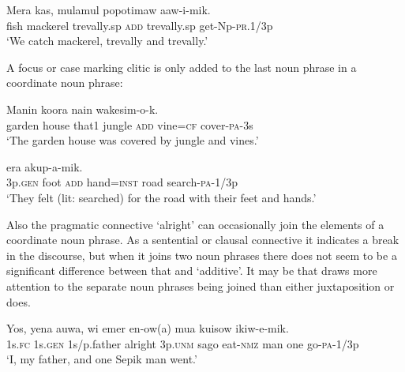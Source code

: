 \ea%
\label{ex:4:x814}
\gll Mera  kas,  mulamul    popotimaw  aaw-i-mik. \\
   fish  mackerel  trevally.sp  \textsc{add}  trevally.sp  get-Np-\textsc{pr}.1/3p   \\
\glt`We catch mackerel,   trevally and   trevally.'
\z

A focus or case marking clitic is only added to the last noun phrase in a coordinate noun phrase:

\ea%
\label{ex:4:x893}
\gll Manin  koora  nain      wakesim-o-k. \\
     garden  house  that1  jungle  \textsc{add}  vine=\textsc{cf}  cover-\textsc{pa}-3s \\
\glt`The garden house was covered by jungle and vines.'
\z

\ea%
\label{ex:4:x894}
\gll {}     era  akup-a-mik. \\
    3p.\textsc{gen}  foot  \textsc{add}  hand=\textsc{inst}  road  search-\textsc{pa}-1/3p  \\
\glt`They felt (lit: searched) for the road with their feet and hands.'
\z

Also the pragmatic connective  `alright' can occasionally join the elements of a coordinate noun phrase. As a sentential or clausal connective it indicates a break in the discourse, but when it joins two noun phrases there does not seem to be a significant difference between that and  `additive'. It may be that  draws more attention to the separate noun phrases being joined than either juxtaposition or  does.

\ea%
\label{ex:4:x815}
\gll Yos,  yena  auwa,    wi  emer  en-ow(a)  mua  kuisow  ikiw-e-mik.\\
     1s.\textsc{fc}  1s.\textsc{gen}  1s/p.father  alright  3p.\textsc{unm}  sago  eat-\textsc{nmz}  man one  go-\textsc{pa}-1/3p\\
\glt`I, my father, and one Sepik man went.'
\z

